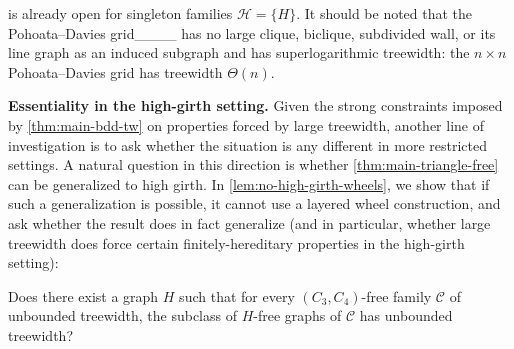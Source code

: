  is already open for singleton families $\mathcal H = \{H\}$.
It should be noted that the Pohoata--Davies grid____ has no large clique, biclique, subdivided wall, or its line graph as an induced subgraph and has superlogarithmic treewidth: the $n \times n$ Pohoata--Davies grid has treewidth $\Theta(n)$.  

\medskip





\textbf{Essentiality in the high-girth setting.} Given the strong constraints imposed by \cref{thm:main-bdd-tw} on properties forced by large treewidth, another line of investigation is to ask whether the situation is any different in more restricted settings. A natural question in this direction is whether \cref{thm:main-triangle-free} can be generalized to high girth. In \cref{lem:no-high-girth-wheels}, we show that if such a generalization is possible, it cannot use a layered wheel construction, and ask whether the result does in fact generalize (and in particular, whether large treewidth does force certain finitely-hereditary properties in the high-girth setting):

\begin{problem} \label{conj:no-high-girth}
    Does there exist a graph $H$ such that for every $(C_3, C_4)$-free family $\mathcal C$ of unbounded treewidth, the subclass of $H$-free graphs of $\mathcal C$ has unbounded treewidth? 
\end{problem}